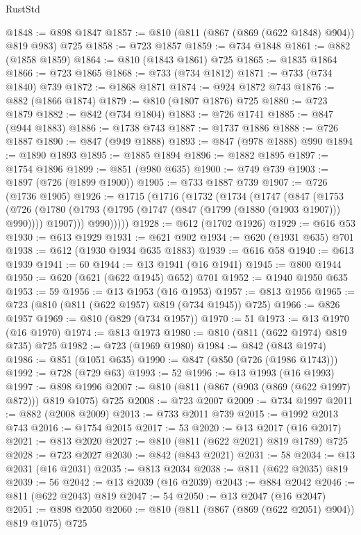 \begin{lexlean}{RustStd}
\begin{coremodule}
@1848 := @898 @1847
@1857 := @810 (@811 (@867 (@869 (@622 @1848) @904)) @819 @983) @725
@1858 := @723 @1857
@1859 := @734 @1848
@1861 := @882 (@1858 @1859)
@1864 := @810 (@1843 @1861) @725
@1865 := @1835 @1864
@1866 := @723 @1865
@1868 := @733 (@734 @1812)
@1871 := @733 (@734 @1840) @739
@1872 := @1868 @1871
@1874 := @924 @1872 @743
@1876 := @882 (@1866 @1874)
@1879 := @810 (@1807 @1876) @725
@1880 := @723 @1879
@1882 := @842 (@734 @1804)
@1883 := @726 @1741
@1885 := @847 (@944 @1883)
@1886 := @1738 @743
@1887 := @1737 @1886
@1888 := @726 @1887
@1890 := @847 (@949 @1888)
@1893 := @847 (@978 @1888) @990
@1894 := @1890 @1893
@1895 := @1885 @1894
@1896 := @1882 @1895
@1897 := @1754 @1896
@1899 := @851 (@980 @635)
@1900 := @749 @739
@1903 := @1897 (@726 (@1899 @1900))
@1905 := @733 @1887 @739
@1907 := @726 (@1736 @1905)
@1926 := @1715
    (@1716
      (@1732
        (@1734
          (@1747
            (@847
              (@1753
                (@726
                  (@1780 (@1793 (@1795 (@1747 (@847 (@1799 (@1880 (@1903 @1907))) @990)))) @1907)))
              @990)))))
@1928 := @612 (@1702 @1926)
@1929 := @616 @53
@1930 := @613 @1929
@1931 := @621 @902
@1934 := @620 (@1931 @635) @701
@1938 := @612 (@1930 @1934 @635 @1883)
@1939 := @616 @58
@1940 := @613 @1939
@1941 := 60
@1944 := @13 @1941 (@16 @1941)
@1945 := @800 @1944
@1950 := @620 (@621 (@622 @1945) @652) @701
@1952 := @1940 @1950 @635
@1953 := 59
@1956 := @13 @1953 (@16 @1953)
@1957 := @813 @1956
@1965 := @723 (@810 (@811 (@622 @1957) @819 (@734 @1945)) @725)
@1966 := @826 @1957
@1969 := @810 (@829 (@734 @1957))
@1970 := 51
@1973 := @13 @1970 (@16 @1970)
@1974 := @813 @1973
@1980 := @810 (@811 (@622 @1974) @819 @735) @725
@1982 := @723 (@1969 @1980)
@1984 := @842 (@843 @1974)
@1986 := @851 (@1051 @635)
@1990 := @847 (@850 (@726 (@1986 @1743)))
@1992 := @728 (@729 @63)
@1993 := 52
@1996 := @13 @1993 (@16 @1993)
@1997 := @898 @1996
@2007 := @810 (@811 (@867 (@903 (@869 (@622 @1997) @872))) @819 @1075) @725
@2008 := @723 @2007
@2009 := @734 @1997
@2011 := @882 (@2008 @2009)
@2013 := @733 @2011 @739
@2015 := @1992 @2013 @743
@2016 := @1754 @2015
@2017 := 53
@2020 := @13 @2017 (@16 @2017)
@2021 := @813 @2020
@2027 := @810 (@811 (@622 @2021) @819 @1789) @725
@2028 := @723 @2027
@2030 := @842 (@843 @2021)
@2031 := 58
@2034 := @13 @2031 (@16 @2031)
@2035 := @813 @2034
@2038 := @811 (@622 @2035) @819
@2039 := 56
@2042 := @13 @2039 (@16 @2039)
@2043 := @884 @2042
@2046 := @811 (@622 @2043) @819
@2047 := 54
@2050 := @13 @2047 (@16 @2047)
@2051 := @898 @2050
@2060 := @810 (@811 (@867 (@869 (@622 @2051) @904)) @819 @1075) @725

\end{coremodule}
\end{lexlean}
